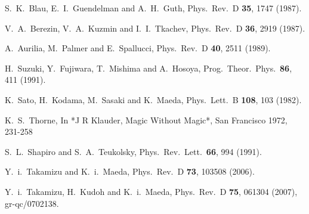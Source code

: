   S.~K.~Blau, E.~I.~Guendelman and A.~H.~Guth,
  Phys.\ Rev.\ D {\bf 35}, 1747 (1987).

  V.~A.~Berezin, V.~A.~Kuzmin and I.~I.~Tkachev,
  Phys.\ Rev.\ D {\bf 36}, 2919 (1987).

  A.~Aurilia, M.~Palmer and E.~Spallucci,
  Phys.\ Rev.\ D {\bf 40}, 2511 (1989).

  H.~Suzuki, Y.~Fujiwara, T.~Mishima and A.~Hosoya,
  Prog.\ Theor.\ Phys.\  {\bf 86}, 411 (1991).

  K.~Sato, H.~Kodama, M.~Sasaki and K.~Maeda, 
  Phys.\ Lett.\ B {\bf 108}, 103 (1982).

  K.~S.~Thorne,
  In *J R Klauder, Magic Without Magic*, San Francisco 1972, 231-258

  S.~L.~Shapiro and S.~A.~Teukolsky,
  Phys.\ Rev.\ Lett.\  {\bf 66}, 994 (1991).

Y.~i.~Takamizu and K.~i.~Maeda, 
  Phys.\ Rev.\ D {\bf 73}, 103508 (2006). 

  Y.~i.~Takamizu, H.~Kudoh and K.~i.~Maeda,
  Phys.\ Rev.\ D {\bf 75}, 061304 (2007), 
  gr-qc/0702138.
